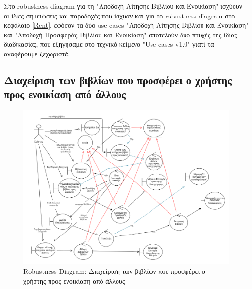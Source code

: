 \documentclass[12pt,a4paper]{article}
\begin{document}
Στο robustness diagram για τη "Αποδοχή Αίτησης Βιβλίου και Ενοικίαση" ισχύουν οι ίδιες σημειώσεις και παραδοχές που ίσχυαν και για το robustness diagram στο κεφάλαιο \ref{Rent}, εφόσον τα δύο use cases "Αποδοχή Αίτησης Βιβλίου και Ενοικίαση" και "Αποδοχή Προσφοράς Βιβλίου και Ενοικίαση" αποτελούν δύο πτυχές της ίδιας διαδικασίας, που εξηγήσαμε στο τεχνικό κείμενο "Use-cases-v1.0" γιατί τα αναφέρουμε ξεχωριστά.

\subsection{Διαχείριση των βιβλίων που προσφέρει ο χρήστης προς ενοικίαση από άλλους}
\begin{figure}[H]
	\includegraphics[width=\textwidth]{Manage User Book Listings Robustness.png}
	\caption{Robustness Diagram: Διαχείριση των βιβλίων που προσφέρει ο χρήστης προς ενοικίαση από άλλους}
	\label{Robustness Diagram: Διαχείριση των βιβλίων που προσφέρει ο χρήστης προς ενοικίαση από άλλους}
\end{figure}
\end{document}
